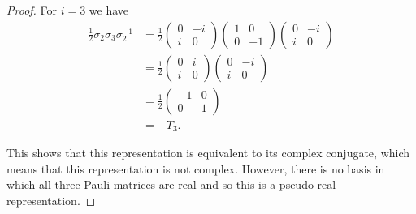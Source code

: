 \begin{thm}{}{}
\begin{proof}
        For \(i = 3\) we have
        \begin{align}
            \frac{1}{2}\sigma_2\sigma_3\sigma_{2}^{-1} &= \frac{1}{2}
            \begin{pmatrix}
                0 & -i\\
                i & 0
            \end{pmatrix}
            \begin{pmatrix}
                1 & 0\\
                0 & -1
            \end{pmatrix}
            \begin{pmatrix}
                0 & -i\\
                i & 0
            \end{pmatrix}
            \\
            &= \frac{1}{2}
            \begin{pmatrix}
                0 & i\\
                i & 0
            \end{pmatrix}
            \begin{pmatrix}
                0 & -i\\
                i & 0
            \end{pmatrix}
            \\
            &= \frac{1}{2}
            \begin{pmatrix}
                -1 & 0\\
                0 & 1
            \end{pmatrix}
            \\
            &= -T_3.
        \end{align}
        
        This shows that this representation is equivalent to its complex conjugate, which means that this representation is not complex.
        However, there is no basis in which all three Pauli matrices are real and so this is a pseudo-real representation.
    \end{proof}
\end{thm}